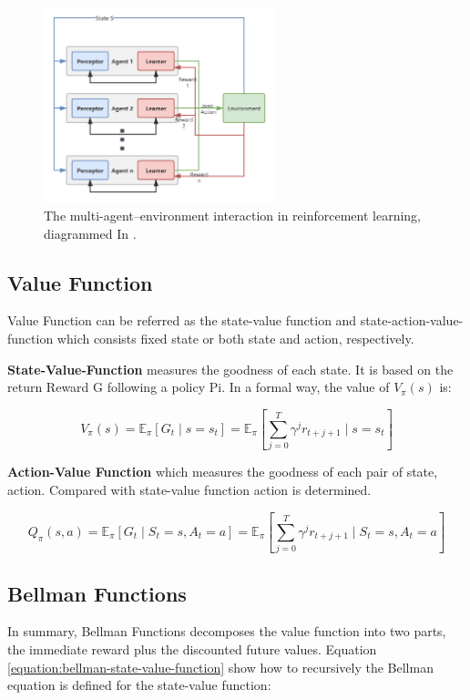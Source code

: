 \begin{figure}[htbp]
\centering
\includegraphics[width=0.6\textwidth]{./images/multi-agent-environment-interaction.png}
\caption{The multi-agent–environment interaction in reinforcement learning, diagrammed In \parencite{en13010123}.}
\label{fig:multi-agent-environment-interaction}
\end{figure}

\subsection{Value Function} \label{background:value-function}
Value Function can be referred as the state-value function and state-action-value-function which consists fixed state or both state and action, respectively.

\textbf{State-Value-Function} measures the goodness of each state. It is based on the return Reward G following a policy Pi. In a formal way, the value of $V_\pi(s)$ is:

\begin{equation} 
V_{\pi}(s)=\mathbb{E}_{\pi}\left[G_{t} \mid s=s_{t}\right]=\mathbb{E}_{\pi}\left[\sum_{j=0}^{T} \gamma^{j} r_{t+j+1} \mid s=s_{t}\right]
\end{equation}

\textbf{Action-Value Function} which measures the goodness of each pair of state, action. Compared with state-value function action is determined.

\begin{equation}
Q_{\pi}(s, a)=\mathbb{E}_{\pi}\left[G_{t} \mid S_{t}=s, A_{t}=a\right]=\mathbb{E}_{\pi}\left[\sum_{j=0}^{T} \gamma^{j} r_{t+j+1} \mid S_{t}=s, A_{t}=a\right]
\end{equation}

\subsection{Bellman Functions}
In summary, Bellman Functions decomposes the value function into two parts, the immediate reward plus the discounted future values. Equation \ref{equation:bellman-state-value-function} show how to recursively the Bellman equation is defined for the state-value function:

